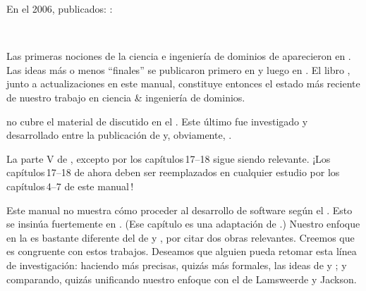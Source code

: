
\begynd
\pind En el 2006,  publicados: \cite{TheSEBook1,TheSEBook2,TheSEBook3}:
\afslut

\begin{center}
\ \
\ \
\end{center}

\label{Domain Engineering 2016 2022}
\begynd
\pind Las primeras nociones de la ciencia e ingeniería de dominios de
      \cite{BjornerMonograph2020} aparecieron en \cite[2010]{Kiev:2010ptI,Kiev:2010ptII}.
\pind Las ideas más o menos ``finales'' se publicaron primero en \cite[2017]{BjornerFAoC2015MDAAD} y 
      luego en \cite[marzo de 2019]{BjornerTOSEM2018}.
\pind El libro \cite{BjornerMonograph2020}, junto a actualizaciones en este
      manual, constituye entonces el estado más reciente de nuestro trabajo en ciencia
      & ingeniería de dominios.

\pind \cite[Ingeniería de Software, III, parte V]{TheSEBook3} no
      cubre el material de  discutido en el
      \cite[capítulo 8: Facetas del Dominio]{BjornerMonograph2020}.
\begynd
\pind Este último fue investigado \cite{dines:facs:2008} y desarrollado entre la publicación
      de \cite{TheSEBook3} y, obviamente, \cite{BjornerMonograph2020}.
\afslut
\afslut

\begynd
\pind La parte V de \cite{TheSEBook3}, excepto por los capítulos\,17--18 sigue siendo
      relevante.
\pind ¡Los capítulos\,17--18 de \cite{TheSEBook3} ahora deben ser reemplazados en
      cualquier estudio por los capítulos\,4--7 de \cite{BjornerMonograph2020} 
      este manual\,!
\afslut


\begynd
\pind Este manual no muestra cómo proceder al desarrollo de software según el .
\begynd
\pind Esto se insinúa fuertemente en \cite[capítulo 9]{BjornerMonograph2020}.
\pind (Ese capítulo es una adaptación de \cite[mayo de 2008]{dines:ugo65:2008}.)
\pind Nuestro enfoque en la \sfsl{ingeniería de requisitos} es bastante
      diferente del de \cite[A. van Laamswerde]{Lamsweerde} y
      \cite[M.\ A.\ Jackson]{Jackson2010Facs}, por citar dos obras
      relevantes.
\pind Creemos  que es congruente con estos trabajos.
\pind Deseamos \ysfchg{firmemente} que alguien pueda retomar esta línea de investigación:
\begynd
\pind haciendo más precisas, quizás más formales, las ideas de
       y ;
\pind y comparando, quizás unificando nuestro enfoque con el de
      Lamsweerde y Jackson.
\afslut
\afslut
\afslut
{}

